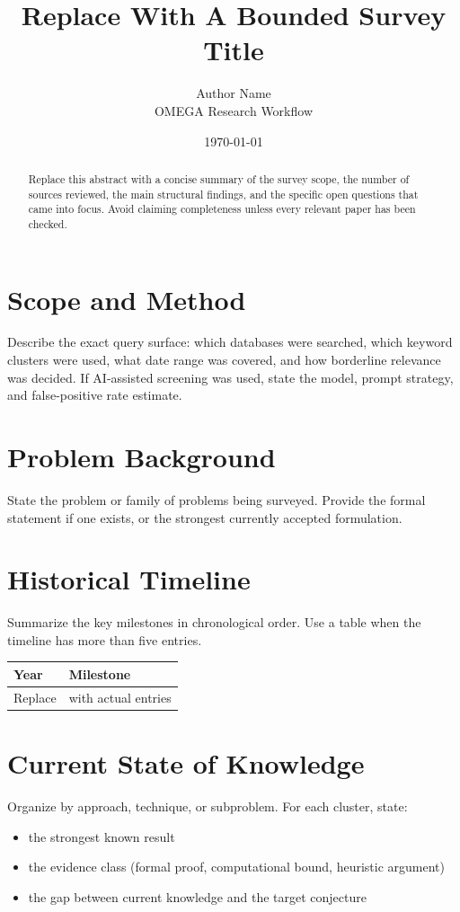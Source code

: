 \documentclass[11pt]{article}
\title{Replace With A Bounded Survey Title}
\author{Author Name \\ \small OMEGA Research Workflow}
\date{\today}
\begin{document}
\maketitle

\begin{abstract}
Replace this abstract with a concise summary of the survey scope, the number of sources reviewed,
the main structural findings, and the specific open questions that came into focus.
Avoid claiming completeness unless every relevant paper has been checked.
\end{abstract}

\section{Scope and Method}
Describe the exact query surface: which databases were searched, which keyword clusters were used,
what date range was covered, and how borderline relevance was decided.
If AI-assisted screening was used, state the model, prompt strategy, and false-positive rate estimate.

\section{Problem Background}
State the problem or family of problems being surveyed.
Provide the formal statement if one exists, or the strongest currently accepted formulation.

\section{Historical Timeline}
Summarize the key milestones in chronological order.
Use a table when the timeline has more than five entries.

\begin{longtable}{lp{10cm}}
\toprule
Year & Milestone \\
\midrule
Replace & with actual entries \\
\bottomrule
\end{longtable}

\section{Current State of Knowledge}
Organize by approach, technique, or subproblem.
For each cluster, state:
\begin{itemize}[leftmargin=1.5em]
  \item the strongest known result
  \item the evidence class (formal proof, computational bound, heuristic argument)
  \item the gap between current knowledge and the target conjecture
\end{itemize}
\end{document}
